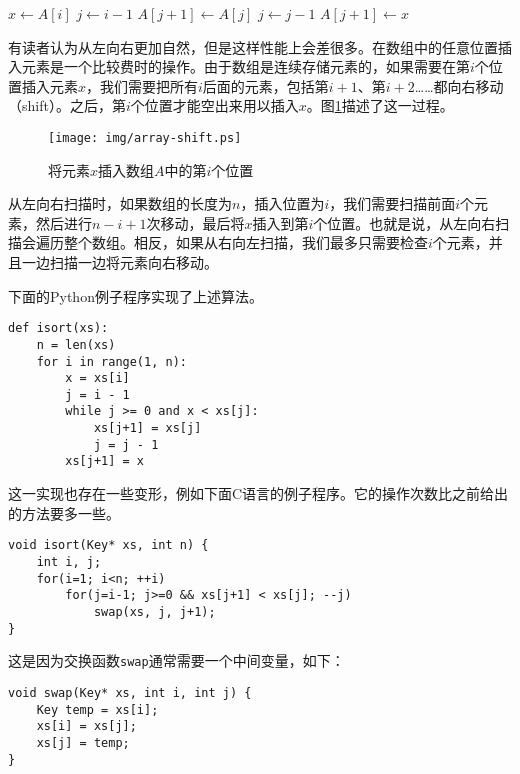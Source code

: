 \documentclass[UTF8]{article}
\begin{document}
\begin{algorithmic}[1]
    \State $x \gets A[i]$
    \State $j \gets i-1$
      \State $A[j+1] \gets A[j]$
      \State $j \gets j - 1$
    \EndWhile
    \State $A[j+1] \gets x$
  \EndFor
\EndFunction
\end{algorithmic}

有读者认为从左向右更加自然，但是这样性能上会差很多。在数组中的任意位置插入元素是一个比较费时的操作。由于数组是连续存储元素的，如果需要在第$i$个位置插入元素$x$，我们需要把所有$i$后面的元素，包括第$i+1$、第$i+2$……都向右移动（shift）。之后，第$i$个位置才能空出来用以插入$x$。图\ref{fig:array-shift}描述了这一过程。

\begin{figure}[htbp]
  \centering
  \texttt{[image: img/array-shift.ps]}
  \caption{将元素$x$插入数组$A$中的第$i$个位置}
  \label{fig:array-shift}
\end{figure}

从左向右扫描时，如果数组的长度为$n$，插入位置为$i$，我们需要扫描前面$i$个元素，然后进行$n-i+1$次移动，最后将$x$插入到第$i$个位置。也就是说，从左向右扫描会遍历整个数组。相反，如果从右向左扫描，我们最多只需要检查$i$个元素，并且一边扫描一边将元素向右移动。

下面的Python例子程序实现了上述算法。

\lstset{language=Python}
\begin{lstlisting}
def isort(xs):
    n = len(xs)
    for i in range(1, n):
        x = xs[i]
        j = i - 1
        while j >= 0 and x < xs[j]:
            xs[j+1] = xs[j]
            j = j - 1
        xs[j+1] = x
\end{lstlisting}

这一实现也存在一些变形，例如下面C语言的例子程序。它的操作次数比之前给出的方法要多一些。

\lstset{language=C}
\begin{lstlisting}
void isort(Key* xs, int n) {
    int i, j;
    for(i=1; i<n; ++i)
        for(j=i-1; j>=0 && xs[j+1] < xs[j]; --j)
            swap(xs, j, j+1);
}
\end{lstlisting}

这是因为交换函数\texttt{swap}通常需要一个中间变量，如下：

\begin{lstlisting}
void swap(Key* xs, int i, int j) {
    Key temp = xs[i];
    xs[i] = xs[j];
    xs[j] = temp;
}
\end{lstlisting}
\end{document}
